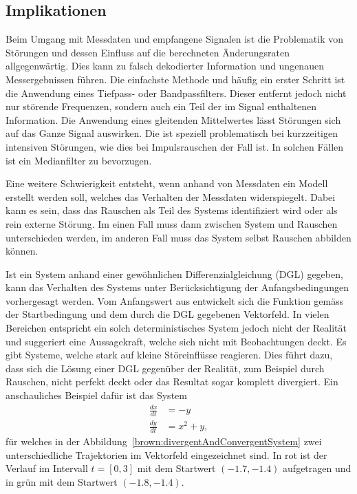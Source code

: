 \subsection{Implikationen\label{brown:Rauschen:Implikationen}}

Beim Umgang mit Messdaten und empfangene Signalen ist die Problematik von Störungen und dessen Einfluss auf die berechneten Änderungsraten allgegenwärtig. Dies  kann zu falsch dekodierter Information und ungenauen Messergebnissen führen. Die einfachste Methode und häufig ein erster Schritt ist die Anwendung eines Tiefpass- oder Bandpassfilters. Dieser entfernt jedoch nicht nur störende Frequenzen, sondern auch ein Teil der im Signal enthaltenen Information. Die Anwendung eines gleitenden Mittelwertes lässt Störungen sich auf das Ganze Signal auswirken. Die ist speziell problematisch bei kurzzeitigen intensiven Störungen, wie dies bei Impulsrauschen der Fall ist. In solchen Fällen ist ein Medianfilter zu bevorzugen.

Eine weitere Schwierigkeit entsteht, wenn anhand von Messdaten ein Modell erstellt werden soll, welches das Verhalten der Messdaten widerspiegelt. Dabei kann es sein, dass das Rauschen als Teil des Systems identifiziert wird oder als rein externe Störung. Im einen Fall muss dann zwischen System und Rauschen unterschieden werden, im anderen Fall muss das System selbst Rauschen abbilden können.

Ist ein System anhand einer gewöhnlichen Differenzialgleichung (DGL) gegeben, kann das Verhalten des Systems unter Berücksichtigung der Anfangsbedingungen vorhergesagt werden. Vom Anfangswert aus entwickelt sich die Funktion gemäss der Startbedingung und dem durch die DGL gegebenen Vektorfeld. In vielen Bereichen entspricht ein solch deterministisches System jedoch nicht der Realität und suggeriert eine Aussagekraft, welche sich nicht mit Beobachtungen deckt. Es gibt Systeme, welche stark auf kleine Störeinflüsse reagieren. Dies führt dazu, dass sich die Lösung einer DGL gegenüber der Realität, zum Beispiel durch Rauschen, nicht perfekt deckt oder das Resultat sogar komplett divergiert. Ein anschauliches Beispiel dafür ist das System
\begin{align}
	\frac{dx}{dt} &= -y \\
	\frac{dy}{dt} &= x^2 + y
	\label{brown:divergentEquation},
\end{align}
für welches in der Abbildung~\ref{brown:divergentAndConvergentSystem} zwei unterschiedliche Trajektorien im Vektorfeld eingezeichnet sind. In rot ist der Verlauf im Intervall  $ t = [0, 3] $ mit dem Startwert $ (-1.7, -1.4) $ aufgetragen und in grün mit dem Startwert $ (-1.8, -1.4) $.

